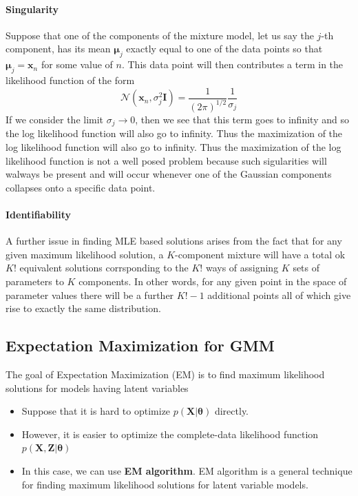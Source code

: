\paragraph{Singularity}
Suppose that one of the components of the mixture model, let us say the $j$-th component, has its mean $\mathbf{\mu}_j$ exactly equal to one of the data points so that $\mathbf{\mu}_j=\mathbf{x}_n$ for some value of $n$. This data point will then contributes a term in the likelihood function of the form 
$$\mathcal{N}(\mathbf{x}_n, \sigma_j^2\mathbf{I}) = \frac{1}{(2\pi)^{1/2}} \frac{1}{\sigma_j}$$
If we consider the limit $\sigma_j \to 0$, then we see that this term goes to infinity and so the log likelihood function will also go to infinity. Thus the maximization of the log likelihood function will also go to infinity. Thus the maximization of the log likelihood function is not a well posed problem because such sigularities will walways be present and will occur whenever one of the Gaussian components collapses onto a specific data point. 

\paragraph{Identifiability}
A further issue in finding MLE based solutions arises from the fact that for any given maximum likelihood solution, a $K$-component mixture will have a total ok $K!$ equivalent solutions corrsponding to the $K!$ ways of assigning $K$ sets of parameters to $K$ components. In other words, for any given point in the space of parameter values there will be a further $K!-1$ additional points all of which give rise to exactly the same distribution. 

\subsection{Expectation Maximization for GMM}

The goal of Expectation Maximization (EM) is to find maximum likelihood solutions for models having latent variables 
\begin{itemize}
	\item Suppose that it is hard to optimize $p(\mathbf{X}|\boldsymbol{\theta})$ directly.
	\item However, it is easier to optimize the complete-data likelihood function $p(\mathbf{X}, \mathbf{Z}|\boldsymbol{\theta})$ 
	\item In this case, we can use \textbf{EM algorithm}. EM algorithm is a general technique for finding maximum likelihood solutions for latent variable models. 
\end{itemize}

